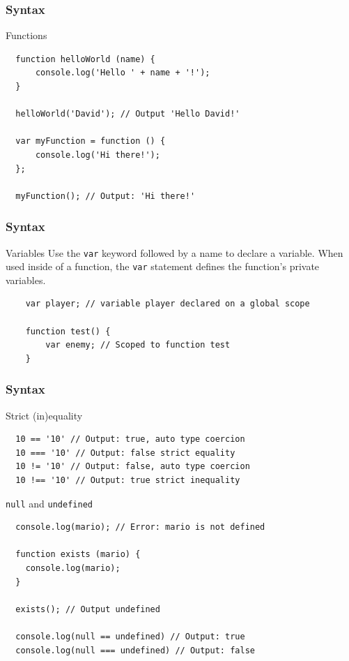 \begin{frame}[fragile]
  \frametitle{Syntax}

  \begin{block}{Functions}
  {\scriptsize
  \begin{verbatim}
  function helloWorld (name) {
      console.log('Hello ' + name + '!');
  }

  helloWorld('David'); // Output 'Hello David!'

  var myFunction = function () {
      console.log('Hi there!');
  };

  myFunction(); // Output: 'Hi there!'
  \end{verbatim}
  }
  \end{block}
\end{frame}

\begin{frame}[fragile]
  \frametitle{Syntax}

  \begin{block}{Variables}
    Use the \texttt{var} keyword followed by a name to declare a variable. When used inside of a function, the \texttt{var} statement defines the function's private variables.
    {\scriptsize
    \begin{verbatim}
    var player; // variable player declared on a global scope

    function test() {
        var enemy; // Scoped to function test
    }
    \end{verbatim}
    }
  \end{block}
\end{frame}

\begin{frame}[fragile]
  \frametitle{Syntax}

  \begin{block}{Strict (in)equality}
  {\scriptsize
  \begin{verbatim}
  10 == '10' // Output: true, auto type coercion
  10 === '10' // Output: false strict equality
  10 != '10' // Output: false, auto type coercion
  10 !== '10' // Output: true strict inequality
  \end{verbatim}
  }
  \end{block}

  \pause

  \begin{block}{\texttt{null} and \texttt{undefined}}
  {\scriptsize
  \begin{verbatim}
  console.log(mario); // Error: mario is not defined

  function exists (mario) {
    console.log(mario);
  }

  exists(); // Output undefined

  console.log(null == undefined) // Output: true 
  console.log(null === undefined) // Output: false 
  \end{verbatim}
  }
  \end{block}
\end{frame}

